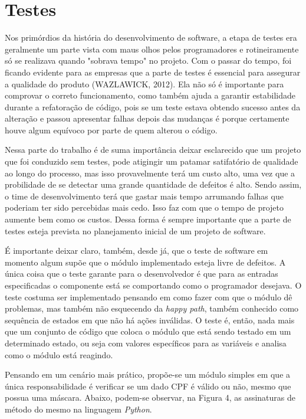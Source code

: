 \documentclass[
    12pt,       %
    openright,      %
    twoside,      %
    a4paper,      %
    english,      %
    french,       %
    spanish,      %
    brazil,       %
    ]{abntex2}
\begin{document}
  \chapter{Testes}
      Nos primórdios da história do desenvolvimento de software, a etapa de testes
      era geralmente um parte vista com maus olhos pelos programadores e rotineiramente
      só se realizava quando "sobrava tempo" no projeto. Com o passar do tempo, foi
      ficando evidente para as empresas que a parte de testes é essencial para
      assegurar a qualidade do produto (WAZLAWICK, 2012). Ela não só é importante
      para comprovar o correto funcionamento, como também ajuda a garantir
      estabilidade durante a refatoração de código, pois se um teste estava obtendo
      sucesso antes da alteração e passou apresentar falhas depois das mudanças é
      porque certamente houve algum equívoco por parte de quem alterou o código.

      Nessa parte do trabalho é de suma importância deixar esclarecido
      que um projeto que foi conduzido sem testes, pode atigingir um patamar
      satifatório de qualidade ao longo do processo, mas isso provavelmente terá um
      custo alto, uma vez que a probilidade de se detectar uma grande quantidade
      de defeitos é alto. Sendo assim, o time de desenvolvimento terá que gastar
      mais tempo arrumando falhas que poderiam ter sido percebidas mais cedo.
      Isso faz com que o tempo de projeto aumente bem como os custos. Dessa forma
      é sempre importante que a parte de testes esteja prevista no planejamento
      inicial de um projeto de software.

      É importante deixar claro, também, desde já, que o teste de software em momento
      algum supõe que o módulo implementado esteja livre de defeitos. A única coisa que o
      teste garante para o desenvolvedor é que para as entradas especificadas o
      componente está se comportando como o programador desejava. O teste costuma
      ser implementado pensando em como fazer com que o módulo dê problemas, mas
      também não esquecendo da \textit{happy path}, também conhecido como sequência
      de estados em que não há ações inválidas. O teste é, então, nada mais que um conjunto
      de código que coloca o módulo que está sendo testado em um determinado estado,
      ou seja com valores específicos para as variáveis e analisa como o módulo está
      reagindo.

      Pensando em um cenário mais prático, propõe-se um módulo simples em que a única
      responsabilidade é verificar se um dado CPF é válido ou não, mesmo que possua uma
      máscara. Abaixo, podem-se observar, na Figura 4, as assinaturas de método do
      mesmo na linguagem
      \textit{Python}.
\end{document}
